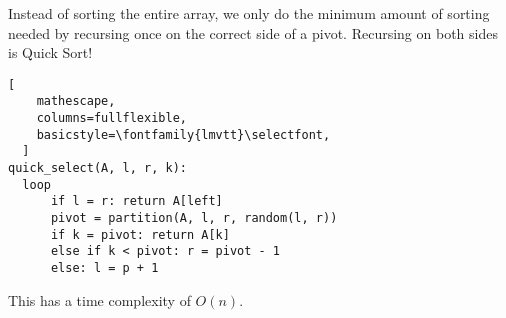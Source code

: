 Instead of sorting the entire array, we only do the minimum amount of sorting needed by recursing
once on the correct side of a pivot. Recursing on both sides is Quick Sort!

\begin{lstlisting}[
    mathescape,
    columns=fullflexible,
    basicstyle=\fontfamily{lmvtt}\selectfont,
  ]
quick_select(A, l, r, k):
  loop
      if l = r: return A[left]
      pivot = partition(A, l, r, random(l, r))
      if k = pivot: return A[k]
      else if k < pivot: r = pivot - 1
      else: l = p + 1
\end{lstlisting}

This has a time complexity of $O(n)$.